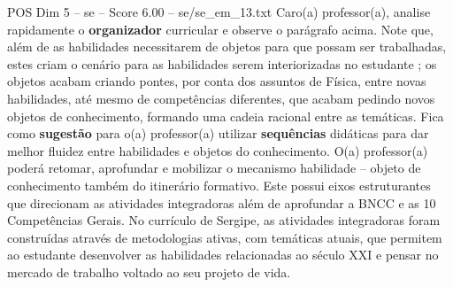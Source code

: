 \begin{textsample}{POS Dim 5 – se – Score 6.00 – se/se\_em\_13.txt}
Caro(a) professor(a), analise rapidamente o \textbf{organizador} curricular e observe o parágrafo acima.
Note que, além de as habilidades necessitarem de objetos para que possam ser trabalhadas, estes criam o cenário para as habilidades serem interiorizadas no estudante ; os objetos acabam criando pontes, por conta dos assuntos de Física, entre novas habilidades, até mesmo de competências diferentes, que acabam pedindo novos objetos de conhecimento, formando uma cadeia racional entre as temáticas.
Fica como \textbf{sugestão} para o(a) professor(a) utilizar \textbf{sequências} didáticas para dar melhor fluidez entre habilidades e objetos do conhecimento.
O(a) professor(a) poderá retomar, aprofundar e mobilizar o mecanismo habilidade – objeto de conhecimento também do itinerário formativo.
Este possui eixos estruturantes que direcionam as atividades integradoras além de aprofundar a BNCC e as 10 Competências Gerais.
No currículo de Sergipe, as atividades integradoras foram construídas através de metodologias ativas, com temáticas atuais, que permitem ao estudante desenvolver as habilidades relacionadas ao século XXI e pensar no mercado de trabalho voltado ao seu projeto de vida.

\end{textsample}

